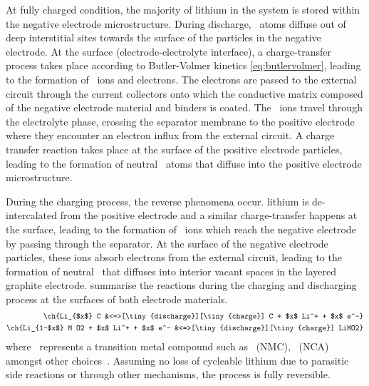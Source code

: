 At fully  charged condition,  the majority  of lithium in  the system  is stored
within the negative electrode  microstructure. During discharge, ~atoms
diffuse out of  deep interstitial sites towards the surface  of the particles in
the  negative  electrode.  At  the  surface  (electrode-electrolyte  interface),
a  charge-transfer  process  takes  place according  to  Butler-Volmer  kinetics
\cref{eq:butlervolmer},  leading   to  the   formation  of   ~ions  and
electrons. The electrons are passed to  the external circuit through the 
current collectors  onto which  the conductive matrix  composed of  the negative
electrode material and binders is  coated. The ~ions travel through the
electrolyte phase,  crossing the  separator membrane  to the  positive electrode
where they  encounter an  electron influx  from the  external circuit.  A charge
transfer  reaction  takes  place  at  the  surface  of  the  positive  electrode
particles, leading to the formation of neutral ~atoms that diffuse into
the positive electrode microstructure.

During  the   charging  process,  the   reverse  phenomena  occur.   lithium  is
de-intercalated  from  the  positive  electrode and  a  similar  charge-transfer
happens  at  the surface,  leading  to  the  formation of  ~ions  which
reach  the  negative  electrode  by   passing  through  the  separator.  At  the
surface of  the negative electrode  particles, these ions absorb  electrons from
the  external  circuit,  leading  to the  formation  of  neutral~  that
diffuses  into  interior  vacant  spaces  in  the  layered  graphite  electrode.
 summarise the  reactions during the
charging and discharging process at the surfaces of both electrode materials.
\begin{align}
    \ch{Li_{$x$} C                            &<=>[\tiny{discharge}][\tiny{charge}] C + $x$ Li^+ + $x$ e^-}\label{eq:NegElectrodeRxn}\\
    \ch{Li_{1-$x$} M O2 + $x$ Li^+  + $x$ e^- &<=>[\tiny{discharge}][\tiny{charge}] LiMO2}\label{eq:PosElectrodeRxn}
\end{align}
where    ~represents    a    transition   metal    compound   such    as
~(NMC),   ~(NCA)
amongst other  choices~\cite{Reddy2011}. Assuming  no loss of  cycleable lithium
due to  parasitic side  reactions or  through other  mechanisms, the  process is
fully reversible.


